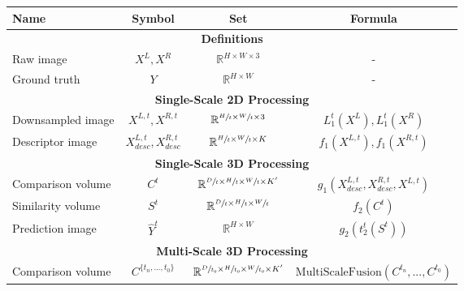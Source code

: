 \documentclass[10pt]{article}
\begin{document}
\begin{table}[]
    \centering
    \begin{tabular}{ l|c|c|c }
    Name & Symbol & Set & Formula \rule{0pt}{2ex}\\
    
    \hline
    \multicolumn{4}{c}{ \textbf{Definitions} } \rule{0pt}{2.4ex}\\
    \hline
    
    Raw image & $X^L, X^R$ & $\mathbb{R}^{H \times W \times 3}$ & -  \rule{0pt}{2.5ex} \\
    
    Ground truth & $Y$ & $\mathbb{R}^{H \times W}$ & - \rule{0pt}{2.5ex} \\
    
    \hline
    \multicolumn{4}{c}{ \textbf{Single-Scale 2D Processing} } \rule{0pt}{2.4ex}\\
    \hline
    
    Downsampled image & $X^{L,t}, X^{R, t}$ & $\mathbb{R}^{\sfrac{H}{t} \times \sfrac{W}{t} \times 3}$ & $L_1^t(X^L), L_1^t(X^R)$  \rule{0pt}{3ex} \\
    
    Descriptor image & $X^{L,t}_{desc}, X^{R, t}_{desc}$ & $\mathbb{R}^{\sfrac{H}{t} \times \sfrac{W}{t} \times K}$ & $f_1(X^{L,t}), f_1(X^{R, t})$  \rule{0pt}{3.5ex} \rule[-1.3ex]{0pt}{0pt}\\
    
    \hline
    \multicolumn{4}{c}{ \textbf{Single-Scale 3D Processing} } \rule{0pt}{2.4ex}\\
    \hline
    
    Comparison volume & $C^{t}$ & $ \mathbb{R}^{ \sfrac{D}{t} \times \sfrac{H}{t} \times \sfrac{W}{t} \times K' }  $  & $g_1(X^{L,t}_{desc}, X^{R, t}_{desc}, X^{L,t})$ \rule{0pt}{3ex} \\
    
    Similarity volume & $S^{t}$ & $ \mathbb{R}^{ \sfrac{D}{t} \times \sfrac{H}{t} \times \sfrac{W}{t}} $  & $f_2(C^{t})$ \rule{0pt}{3.5ex} \\
    
    Prediction image & $\hat{Y}^{t}$ & $\mathbb{R}^{H \times W}$ & $ g_2(t_2^{t}(S^{t}))$ \rule{0pt}{3.5ex} \\
    
    \hline
    \multicolumn{4}{c}{ \textbf{Multi-Scale 3D Processing} } \rule{0pt}{2.4ex} \\
    \hline
    
    Comparison volume & $C^{ \{ t_n, ... , t_0 \} }$ & $ \mathbb{R}^{ \sfrac{D}{t_0} \times \sfrac{H}{t_0} \times \sfrac{W}{t_0} \times K' }  $  & $\text{MultiScaleFusion}(C^{t_n}, ..., C^{t_0})$ \rule{0pt}{3ex} \\
    

\end{tabular}
\end{table}
\end{document}
